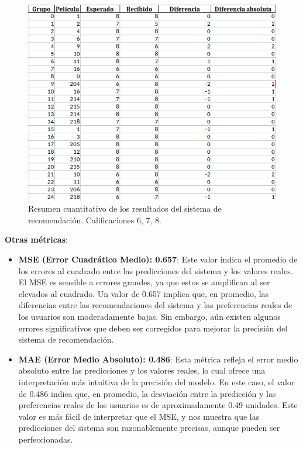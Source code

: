 \documentclass[runningheads,a4paper]{llncs}
\begin{document}
\begin{figure}[h]
    \centering
    \includegraphics[width=\columnwidth]{assets/tabla678.png}
    \caption{Resumen cuantitativo de los resultados del sistema de recomendación. Calificaciones 6, 7, 8.}
    \label{tab:resultados}
\end{figure}

\textbf{Otras métricas}:
\begin{itemize}
    \item \textbf{MSE (Error Cuadrático Medio): 0.657}: Este valor indica el promedio de los errores al cuadrado entre las predicciones del sistema y los valores reales. El MSE es sensible a errores grandes, ya que estos se amplifican al ser elevados al cuadrado. Un valor de 0.657 implica que, en promedio, las diferencias entre las recomendaciones del sistema y las preferencias reales de los usuarios son moderadamente bajas. Sin embargo, aún existen algunos errores significativos que deben ser corregidos para mejorar la precisión del sistema de recomendación. \cite{tesis_sistema_recomendador_hibrido}
    \item \textbf{MAE (Error Medio Absoluto): 0.486}: Esta métrica refleja el error medio absoluto entre las predicciones y los valores reales, lo cual ofrece una interpretación más intuitiva de la precisión del modelo. En este caso, el valor de 0.486 indica que, en promedio, la desviación entre la predicción y las preferencias reales de los usuarios es de aproximadamente 0.49 unidades. Este valor es más fácil de interpretar que el MSE, y nos muestra que las predicciones del sistema son razonablemente precisas, aunque pueden ser perfeccionadas. \cite{tesis_sistema_recomendador_hibrido}
\end{itemize}
\end{document}
